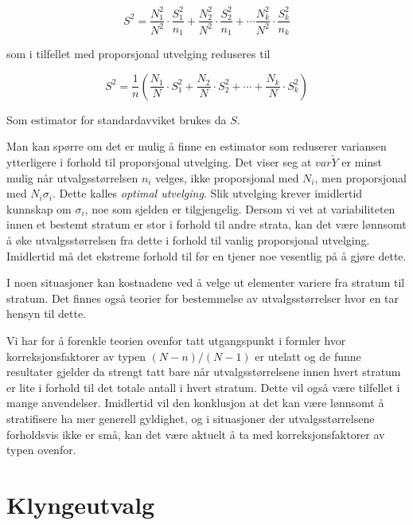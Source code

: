 \[  S^2 =\frac{N_1^2}{N^2} \cdot \frac{S_1^2}{n_1}+
         \frac{N_2^2}{N^2} \cdot \frac{S_2^2}{n_1}+ \cdots
         \frac{N_k^2}{N^2} \cdot \frac{S_k^2}{n_k}   \]

\noindent som i tilfellet med proporsjonal utvelging reduseres til

\[ S^2 = \frac{1}{n}(\frac{N_1}{N} \cdot {S_1^2}+
                           \frac{N_2}{N} \cdot {S_2^2}+\cdots +
                                      \frac{N_k}{N} \cdot {S_k^2}) \]

\noindent Som estimator for standardavviket brukes da $S$.

Man kan spørre om det er mulig å finne en estimator som reduserer
variansen ytterligere i forhold til proporsjonal utvelging.  Det viser seg
at $var\tilde{Y}$ er minst mulig når utvalgsstørrelsen $n_i$ velges,
ikke proporsjonal med $N_i$, men proporsjonal med $N_i{\sigma}_i$.  Dette 
kalles {\em optimal utvelging}.  Slik utvelging krever imidlertid kunnskap
om ${\sigma}_i$, noe som sjelden er tilgjengelig.  Dersom vi vet at 
variabiliteten innen et bestemt stratum er stor i forhold til andre strata,
kan det være lønnsomt å øke utvalgsstørrelsen fra dette
i forhold til vanlig proporsjonal utvelging.  Imidlertid må det ekstreme
forhold til før en tjener noe vesentlig på å gjøre dette.

I noen situasjoner kan kostnadene ved å velge ut elementer variere fra
stratum til stratum.  Det finnes også teorier for bestemmelse av
utvalgs\-størrelser hvor en tar hensyn til dette.

Vi har for å forenkle teorien ovenfor tatt utgangspunkt i formler hvor
korreksjonsfaktorer av typen $(N - n)/(N - 1)$ er utelatt og de funne
resultater gjelder da strengt tatt bare når utvalgsstørrelsene innen
hvert stratum er lite i forhold til det totale antall i hvert stratum.  Dette
vil også være tilfellet i mange anvendelser.  Imidlertid vil den
konklusjon at det kan være lønnsomt å stratifisere ha mer generell
gyldighet, og i situasjoner der utvalgsstørrelsene forholdsvis ikke er 
små, kan det være aktuelt å ta med korreksjonsfaktorer av typen
ovenfor.



\section{Klyngeutvalg}

